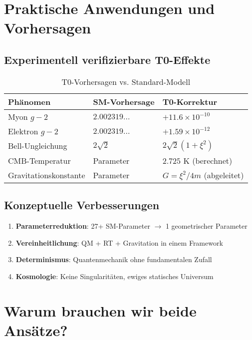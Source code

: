 \documentclass[12pt,a4paper]{article}
\begin{document}
	\section{Praktische Anwendungen und Vorhersagen}
	
	\subsection{Experimentell verifizierbare T0-Effekte}
	
	\begin{table}[h]
		\centering
		\begin{tabular}{|l|l|l|}
			\hline
			\textbf{Phänomen} & \textbf{SM-Vorhersage} & \textbf{T0-Korrektur} \\
			\hline
			Myon $g-2$ & $2.002319...$ & $+11.6 \times 10^{-10}$ \\
			Elektron $g-2$ & $2.002319...$ & $+1.59 \times 10^{-12}$ \\
			Bell-Ungleichung & $2\sqrt{2}$ & $2\sqrt{2}(1 + \xi^2)$ \\
			CMB-Temperatur & Parameter & $2.725$ K (berechnet) \\
			Gravitationskonstante & Parameter & $G = \xi^2/4m$ (abgeleitet) \\
			\hline
		\end{tabular}
		\caption{T0-Vorhersagen vs. Standard-Modell}
	\end{table}
	
	\subsection{Konzeptuelle Verbesserungen}
	
	\begin{enumerate}
		\item \textbf{Parameterreduktion}: 27+ SM-Parameter $\to$ 1 geometrischer Parameter
		\item \textbf{Vereinheitlichung}: QM + RT + Gravitation in einem Framework
		\item \textbf{Determinismus}: Quantenmechanik ohne fundamentalen Zufall
		\item \textbf{Kosmologie}: Keine Singularitäten, ewiges statisches Universum
	\end{enumerate}
	
	\section{Warum brauchen wir beide Ansätze?}
	
\end{document}
